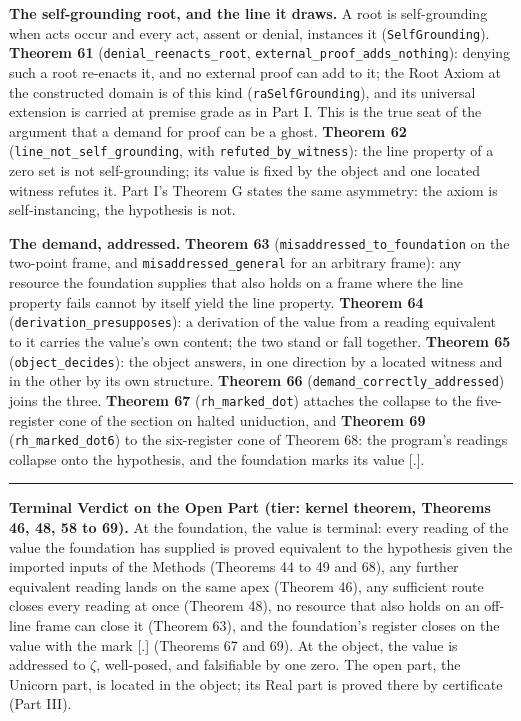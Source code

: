\documentclass[10pt]{article}
\newcommand{\jboxstart}{\begin{jbox}}
\newenvironment{jbox}{\par\vspace{2pt}\noindent\color{accent}\rule{\columnwidth}{0.8pt}\par\vspace{-2pt}\small}{\par\vspace{2pt}}
\begin{document}
\textbf{The self-grounding root, and the line it draws.} A root is
self-grounding when acts occur and every act, assent or denial,
instances it (\texttt{SelfGrounding}). \textbf{Theorem 61}
(\texttt{denial\_reenacts\_root},
\texttt{external\_proof\_adds\_nothing}): denying such a root re-enacts
it, and no external proof can add to it; the Root Axiom at the
constructed domain is of this kind (\texttt{raSelfGrounding}), and its
universal extension is carried at premise grade as in Part I. This is
the true seat of the argument that a demand for proof can be a ghost.
\textbf{Theorem 62} (\texttt{line\_not\_self\_grounding}, with
\texttt{refuted\_by\_witness}): the line property of a zero set is not
self-grounding; its value is fixed by the object and one located witness
refutes it. Part I's Theorem G states the same asymmetry: the axiom is
self-instancing, the hypothesis is not.

\textbf{The demand, addressed.} \textbf{Theorem 63}
(\texttt{misaddressed\_to\_foundation} on the two-point frame, and
\texttt{misaddressed\_general} for an arbitrary frame): any resource the
foundation supplies that also holds on a frame where the line property
fails cannot by itself yield the line property. \textbf{Theorem 64}
(\texttt{derivation\_presupposes}): a derivation of the value from a
reading equivalent to it carries the value's own content; the two stand
or fall together. \textbf{Theorem 65} (\texttt{object\_decides}): the
object answers, in one direction by a located witness and in the other
by its own structure. \textbf{Theorem 66}
(\texttt{demand\_correctly\_addressed}) joins the three. \textbf{Theorem
67} (\texttt{rh\_marked\_dot}) attaches the collapse to the
five-register cone of the section on halted uniduction, and
\textbf{Theorem 69} (\texttt{rh\_marked\_dot6}) to the six-register cone
of Theorem 68: the program's readings collapse onto the hypothesis, and
the foundation marks its value {[}.{]}.

\jboxstart

\textbf{Terminal Verdict on the Open Part (tier: kernel theorem,
Theorems 46, 48, 58 to 69).} At the foundation, the value is terminal:
every reading of the value the foundation has supplied is proved
equivalent to the hypothesis given the imported inputs of the Methods
(Theorems 44 to 49 and 68), any further equivalent reading lands on the
same apex (Theorem 46), any sufficient route closes every reading at
once (Theorem 48), no resource that also holds on an off-line frame can
close it (Theorem 63), and the foundation's register closes on the value
with the mark {[}.{]} (Theorems 67 and 69). At the object, the value is
addressed to \(\zeta\), well-posed, and falsifiable by one zero. The
open part, the Unicorn part, is located in the object; its Real part is
proved there by certificate (Part III).
\end{document}
